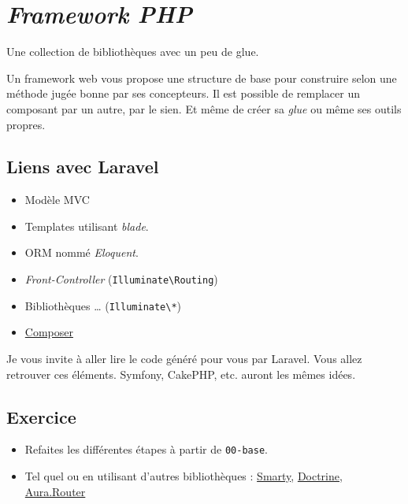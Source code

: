 \hypertarget{framework-php}{%
\section{\texorpdfstring{\emph{Framework
PHP}}{Framework PHP}}\label{framework-php}}

Une collection de bibliothèques avec un peu de glue.

Un framework web vous propose une structure de base pour construire
selon une méthode jugée bonne par ses concepteurs. Il est possible de
remplacer un composant par un autre, par le sien. Et même de créer sa
\emph{glue} ou même ses outils propres.

\hypertarget{liens-avec-laravel}{%
\subsection{Liens avec Laravel}\label{liens-avec-laravel}}

\begin{itemize}
\tightlist
\item
  Modèle MVC
\item
  Templates utilisant \emph{blade}.
\item
  ORM nommé \emph{Eloquent}.
\item
  \emph{Front-Controller}
  (\textenglish{\texttt{Illuminate\textbackslash{}Routing}})
\item
  Bibliothèques \ldots{}
  (\textenglish{\texttt{Illuminate\textbackslash{}*}})
\item
  \href{http://getcomposer.org/}{Composer}
\end{itemize}

Je vous invite à aller lire le code généré pour vous par Laravel. Vous
allez retrouver ces éléments. Symfony, CakePHP, etc. auront les mêmes
idées.

\hypertarget{exercice}{%
\subsection{Exercice}\label{exercice}}

\begin{itemize}
\tightlist
\item
  Refaites les différentes étapes à partir de
  \textenglish{\texttt{00-base}}.
\item
  Tel quel ou en utilisant d'autres bibliothèques :
  \href{https://github.com/smarty-php/smarty}{Smarty},
  \href{https://www.doctrine-project.org/projects/doctrine-orm/en/current/tutorials/getting-started.html}{Doctrine},
  \href{https://github.com/auraphp/Aura.Router}{Aura.Router}
\end{itemize}

